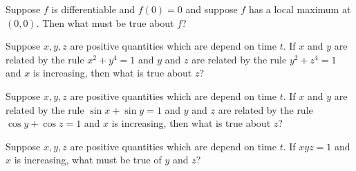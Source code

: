 \documentclass{ximera}
\newcommand{\recommendation}[1]{}
\begin{document}
\begin{problem}
  Suppose $f$ is differentiable and $f(0) = 0$ and suppose $f$ has a
  local maximum at $(0,0)$.  Then what must be true about $f$?
  \begin{multipleChoice}
  \end{multipleChoice}
\end{problem}



\begin{problem}
  Suppose $x, y, z$ are positive quantities which are depend on time
  $t$.  If $x$ and $y$ are related by the rule $x^2 + y^4 = 1$ and $y$
  and $z$ are related by the rule $y^2 + z^4 = 1$ and $x$ is
  increasing, then what is true about $z$?
  \begin{multipleChoice}
  \end{multipleChoice}
\end{problem}

\begin{problem}
  Suppose $x, y, z$ are positive quantities which are depend on time
  $t$.  If $x$ and $y$ are related by the rule $\sin x + \sin y = 1$ and $y$
  and $z$ are related by the rule $\cos y + \cos z = 1$ and $x$ is
  increasing, then what is true about $z$?
  \begin{multipleChoice}
  \end{multipleChoice}
\end{problem}

\begin{problem}
  Suppose $x, y, z$ are positive quantities which are depend on time
  $t$.  If $xyz = 1$ and $x$ is increasing, what must be true of $y$ and $z$?
  \begin{multipleChoice}
  \end{multipleChoice}
\end{problem}
\end{document}
